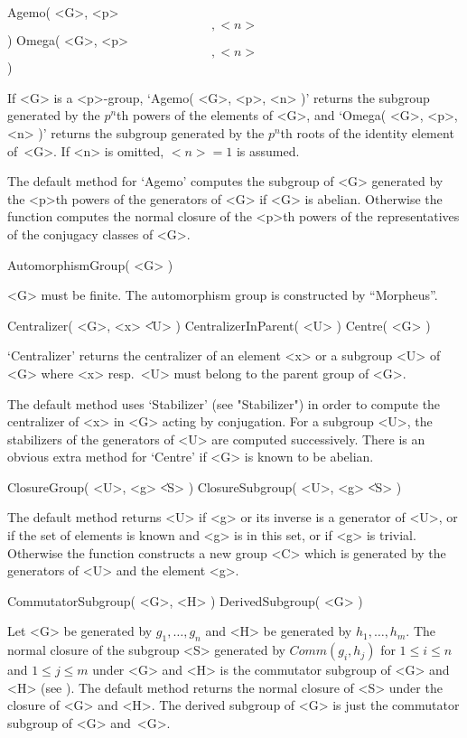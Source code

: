 \>Agemo( <G>, <p> \[, <n> \] )
\>Omega( <G>, <p> \[, <n> \] )

If <G>  is a  <p>-group, `Agemo(  <G>, <p>, <n>   )' returns the subgroup
generated by the $p^n$th powers of the  elements of <G>, and `Omega( <G>,
<p>, <n> )' returns  the subgroup generated by  the $p^n$th roots of  the
identity element of~<G>. If <n> is omitted, $<n>=1$ is assumed.

The default method for `Agemo' computes the  subgroup of <G> generated by
the <p>th  powers of the  generators of <G> if  <G> is abelian. Otherwise
the  function  computes the  normal closure  of  the <p>th  powers of the
representatives of the conjugacy classes of <G>.

\>AutomorphismGroup( <G> )

<G>   must be  finite.    The   automorphism group  is  constructed    by
``Morpheus''.

\>Centralizer( <G>, <x> \| <U> )
\>CentralizerInParent( <U> )
\>Centre( <G> )

`Centralizer' returns the centralizer of an element <x> or a subgroup <U>
of <G> where <x> resp.~<U> must belong to the parent group of <G>.

The  default  method uses  `Stabilizer'  (see  "Stabilizer") in  order to
compute  the  centralizer  of <x>  in  <G> acting  by conjugation.  For a
subgroup <U>,  the stabilizers of  the  generators  of <U>  are  computed
successively.  There is  an obvious extra  method for  `Centre' if <G> is
known to be abelian.

\>ClosureGroup( <U>, <g> \| <S> )
\>ClosureSubgroup( <U>, <g> \| <S> )

The default method returns  <U> if <g> or its  inverse is a generator  of
<U>, or if the set of elements is known and <g> is in this set, or if <g>
is trivial.  Otherwise the function  constructs a new  group <C> which is
generated by the generators of <U> and the element <g>.

\>CommutatorSubgroup( <G>, <H> )
\>DerivedSubgroup( <G> )

Let <G> be generated by $g_1, \ldots, g_n$ and  <H> be generated by $h_1,
\ldots, h_m$. The normal closure of the  subgroup <S> generated by $Comm(
g_i, h_j )$ for $1 \leq i \leq n$ and $1 \leq j \leq m$ under <G> and <H>
is the commutator subgroup  of  <G> and  <H> (see  \cite{Huppert67}). The
default method returns the normal closure of <S> under the closure of <G>
and <H>. The derived subgroup  of <G> is just  the commutator subgroup of
<G> and~<G>.

